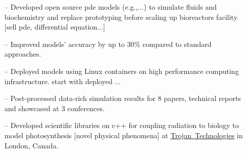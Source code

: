 \documentclass[10pt,a4paper]{altacv}
\begin{document}


%

\begin{fullwidth}
\makecvheader

\end{fullwidth}

%





\begin{itemize}
    \setlength{\itemindent}{0.5em}
    \item[--]   \small{Developed open source pde models (e.g.,...) to simulate fluids and biochemistry and replace prototyping before scaling up bioreactors facility [sell pde, differential equation...]} 
    \item[--] \small{Improved models' accuracy by up to 30\% compared to standard approaches.}
    \item[--] \small{Deployed models using Linux containers on high performance computing infrastructure.  start with deployed ...}
    \item[--]  \small{Post-processed data-rich simulation results for 8 papers, technical reports and showcased at 3 conferences.}
    \item[--]   \small{Developed scientific libraries on c++ for coupling radiation to biology to model photosynthesis [novel physical phenomena] at \href{https://www.trojantechnologies.com/}{Trojan~Technologies} in London, Canada.}
\end{itemize}
\divider\smallskip
\end{document}
